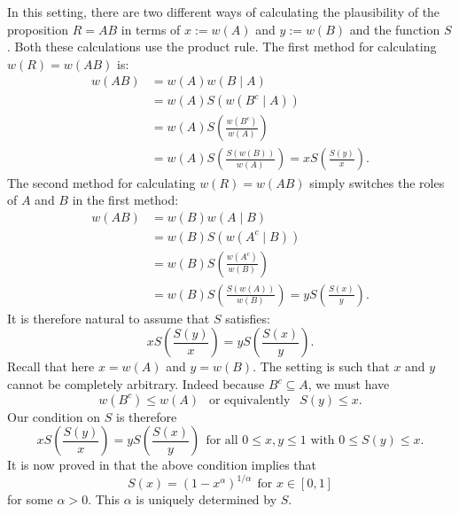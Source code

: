 \documentclass{scrartcl}
\begin{document}
In this setting, there are two different ways of
calculating the plausibility of the proposition $R = A B$ in terms of
$x := w(A)$ and $y := w(B)$ and the function $S$. Both these
calculations use the product rule. The first method for calculating
$w(R) = w(AB)$ is:
\begin{align*}
  w(AB) &= w(A) w(B \mid A) \\
        &= w(A) S \left(w(B^c \mid A) \right) \\
        &= w(A) S \left(\frac{w(B^c)}{w(A)} \right) \\
                                                      &=  w(A) S
                                                        \left(\frac{S(w(B))}{w(A)}
                                                        \right) = x S
                                                        \left(\frac{S(y)}{x}
                                                        \right). 
\end{align*}
The second method for calculating $w(R) = w(A B)$ simply switches the
roles of $A$ and $B$ in the first method:
\begin{align*}
  w(AB) &= w(B)  w(A \mid B) \\
  &= w(B) S \left(w(A^c \mid B) \right) \\
        &= w(B) S \left(\frac{w(A^c)}{w(B)} \right) \\
                                                      &=  w(B) S
                                                        \left(\frac{S(w(A))}{w(B)}
                                                        \right) = y S
                                                        \left(\frac{S(x)}{y}
                                                        \right). 
\end{align*}
It is therefore natural to assume that $S$ satisfies:
\begin{equation*}
  x S
                                                        \left(\frac{S(y)}{x}
                                                        \right) =y S
                                                        \left(\frac{S(x)}{y}
                                                        \right).  
\end{equation*}
Recall that here $x = w(A)$  and $y = w(B)$. The setting is such that
$x$ and $y$ cannot be completely arbitrary. Indeed because $B^c
\subseteq A$, we must have
\begin{equation*}
  w(B^c) \leq w(A) ~~ \text{ or equivalently } ~~ S(y) \leq x.  
\end{equation*}
Our condition on $S$ is therefore
\begin{equation*}
  xS\left(\frac{S(y)}{x} \right) = y S \left(\frac{S(x)}{y} \right)
~~  \text{for all $0 \leq x, y \leq 1$ with $0 \leq S(y) \leq x$}. 
\end{equation*}
It is now proved in \citet[Section 2.2]{Jaynes} that the above condition implies that
\begin{equation*}
  S(x) = (1 - x^{\alpha})^{1/\alpha} ~~\text{for $x \in [0, 1]$}
\end{equation*}
for some $\alpha > 0$. This $\alpha$ is uniquely determined by $S$. 
\end{document}
